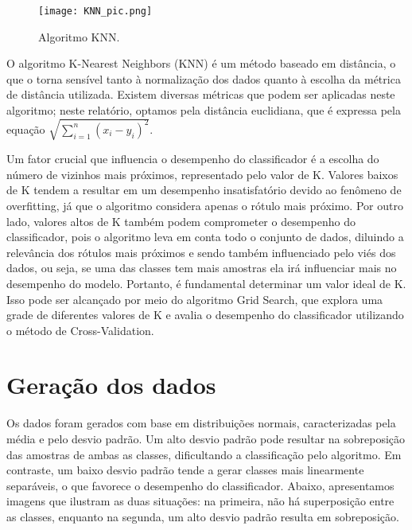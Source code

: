 \documentclass{article} %
\begin{document}
\begin{figure}[h] %
    \centering %
    \texttt{[image: KNN\_pic.png]} %
    \caption{Algoritmo KNN.} %
    \label{fig:exemplo} %
\end{figure}

\vspace{1cm}

O algoritmo K-Nearest Neighbors (KNN) é um método baseado em distância, o que o torna sensível tanto à normalização dos dados quanto à escolha da métrica de distância utilizada. Existem diversas métricas que podem ser aplicadas neste algoritmo; neste relatório, optamos pela distância euclidiana, que é expressa pela equação $\sqrt{\sum_{i=1}^{n} (x_i - y_i)^2}$.

\vspace{1cm}

Um fator crucial que influencia o desempenho do classificador é a escolha do número de vizinhos mais próximos, representado pelo valor de K. Valores baixos de K tendem a resultar em um desempenho insatisfatório devido ao fenômeno de overfitting, já que o algoritmo considera apenas o rótulo mais próximo. Por outro lado, valores altos de K também podem comprometer o desempenho do classificador, pois o algoritmo leva em conta todo o conjunto de dados, diluindo a relevância dos rótulos mais próximos e sendo também influenciado pelo viés dos dados, ou seja, se uma das classes tem mais amostras ela irá influenciar mais no desempenho do modelo. Portanto, é fundamental determinar um valor ideal de K. Isso pode ser alcançado por meio do algoritmo Grid Search, que explora uma grade de diferentes valores de K e avalia o desempenho do classificador utilizando o método de Cross-Validation.

\section{Geração dos dados}

Os dados foram gerados com base em distribuições normais, caracterizadas pela média e pelo desvio padrão. Um alto desvio padrão pode resultar na sobreposição das amostras de ambas as classes, dificultando a classificação pelo algoritmo. Em contraste, um baixo desvio padrão tende a gerar classes mais linearmente separáveis, o que favorece o desempenho do classificador. Abaixo, apresentamos imagens que ilustram as duas situações: na primeira, não há superposição entre as classes, enquanto na segunda, um alto desvio padrão resulta em sobreposição.
\end{document}
